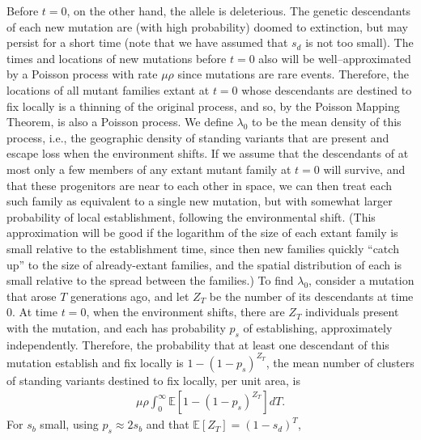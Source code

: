 \documentclass{article}
\newcommand{\E}{\mathbb{E}}
\begin{document}
Before $t=0$, on the other hand, the allele is deleterious.
The genetic descendants of each new mutation are (with high probability) doomed to extinction,
but may persist for a short time (note that we have assumed that $s_d$ is not too small).
The times and locations of new mutations before $t=0$ also will be 
well--approximated by a 
Poisson process with rate $\mu \rho$ %
since mutations are rare events. Therefore,
the locations of all mutant families extant at $t=0$ whose descendants are destined to fix locally is 
a thinning of the original process, 
and so, by the Poisson Mapping Theorem, is also a Poisson process.
We define $\lambda_0$ to be the mean density of this process, 
i.e., the geographic density
of standing variants that are present and escape loss when the
environment shifts.
If we assume that the descendants of at most only a few members of any extant mutant family at $t=0$ will survive,
and that these progenitors are near to each other in space, 
we can then treat each such family as equivalent to a single new mutation,
but with somewhat larger probability of local establishment,
following the environmental shift.
(This approximation will be good 
if the logarithm of the size of each extant family is small relative to the establishment time,
since then new families quickly ``catch up'' to the size of already-extant families,
and the spatial distribution of each is small relative to the spread between the families.)
To find $\lambda_0$, consider a mutation that arose $T$ generations ago, 
and let $Z_T$ be the number of its descendants at time $0$.
At time $t=0$, when the environment shifts, there are $Z_T$ individuals present with the mutation,
and each has probability $p_s$ of establishing, approximately independently.
Therefore, the probability that at least one descendant of this mutation establish and fix locally is $1-(1-p_s)^{Z_T}$,
the mean number of clusters of standing variants destined to fix locally, per unit area, is
\begin{align*}
    \mu \rho \int_0^\infty \E\left[1- (1-p_s)^{Z_T}\right] dT .
\end{align*}
For $s_b$ small, using $p_s \approx 2s_b$ and that $\E[Z_T]=(1-s_d)^T$,
\end{document}

